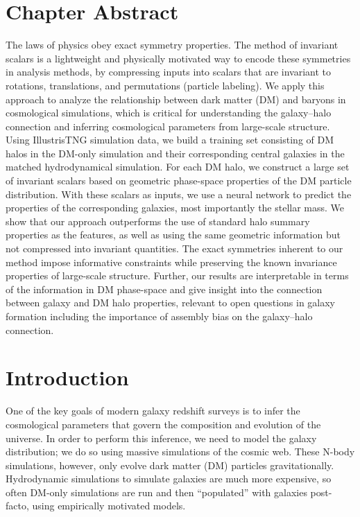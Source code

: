\graphicspath{{figures/figures_eqcosmo/}}


\section{Chapter Abstract}
The laws of physics obey exact symmetry properties.
The method of invariant scalars is a lightweight and physically motivated way to encode these symmetries in analysis methods, by compressing inputs into scalars that are invariant to rotations, translations, and permutations (particle labeling).
We apply this approach to analyze the relationship between dark matter (DM) and baryons in cosmological simulations, which is critical for understanding the galaxy--halo connection and inferring cosmological parameters from large-scale structure.
Using IllustrisTNG simulation data, we build a training set consisting of DM halos in the DM-only simulation and their corresponding central galaxies in the matched hydrodynamical simulation. 
For each DM halo, we construct a large set of invariant scalars based on geometric phase-space properties of the DM particle distribution.
With these scalars as inputs, we use a neural network to predict the properties of the corresponding galaxies, most importantly the stellar mass.
We show that our approach outperforms the use of standard halo summary properties as the features, as well as using the same geometric information but not compressed into invariant quantities.
The exact symmetries inherent to our method impose informative constraints while preserving the known invariance properties of large-scale structure.
Further, our results are interpretable in terms of the information in DM phase-space and give insight into the connection between galaxy and DM halo properties, relevant to open questions in galaxy formation including the importance of assembly bias on the galaxy--halo connection.


\section{Introduction}

One of the key goals of modern galaxy redshift surveys is to infer the cosmological parameters that govern the composition and evolution of the universe.
In order to perform this inference, we need to model the galaxy distribution; we do so using massive simulations of the cosmic web.
These N-body simulations, however, only evolve dark matter (DM) particles gravitationally. 
Hydrodynamic simulations to simulate galaxies are much more expensive, so often DM-only simulations are run and then ``populated'' with galaxies post-facto, using empirically motivated models.

